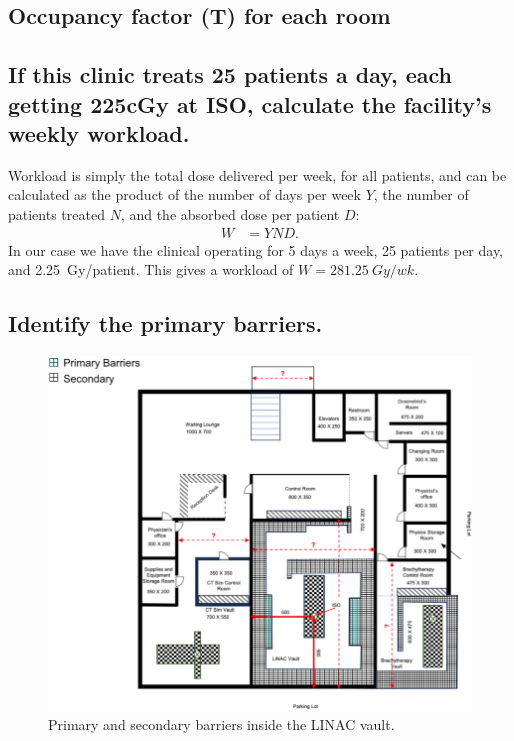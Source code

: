 \documentclass[%
aps,
mph,%
amsmath,amssymb,
preprint,%
tightenlines,
longbibliography,
superscriptaddress,
floatfix,
nofootinbib,
]{revtex4-2}
\begin{document}
    \subsection{Occupancy factor (T) for each room}
    
    \subsection{If this clinic treats 25 patients a day, each getting 225\hspace{0.85pt}cGy at ISO, calculate the facility's weekly workload.}
    Workload is simply the total dose delivered per week, for all patients, and can be calculated as the product of the number of days per week $Y$, the number of patients treated $N$, and the absorbed dose per patient $D$:
    \begin{align}
        W &= YND.
    \end{align}
    In our case we have the clinical operating for 5 days a week, 25 patients per day, and \SI{2.25}{Gy/patient}. This gives a workload of $W = \SI{281.25}{Gy/wk}$. 
    
    \subsection{Identify the primary barriers.}
    \begin{figure}[h!]
        \centering
        \includegraphics[width=0.75\linewidth]{figures/barriers.png}
        \caption{Primary and secondary barriers inside the LINAC vault. }
        \label{barriers}
    \end{figure}
\end{document}
